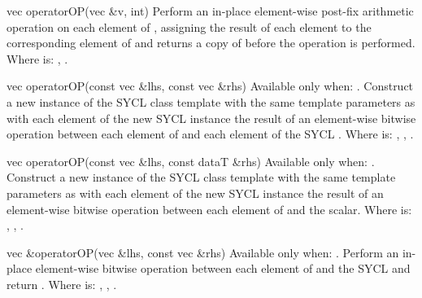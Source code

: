   \addRow
  {vec operatorOP(vec \&v, int)}
  {
    Perform an in-place element-wise  post-fix arithmetic operation on each element of  , assigning the result of each element to the corresponding element of   and returns a copy of   before the operation is performed.
    \newline \newline
    Where  is: \codeinline{++}, \codeinline{--}.
  }
  
  \addRow
  {vec operatorOP(const vec \&lhs, const vec \&rhs)}
  {
    Available only when: .
    \newline
    Construct a new instance of the SYCL  class template with the same template parameters as   with each element of the new SYCL  instance the result of an element-wise  bitwise operation between each element of   and each element of the  SYCL .
    \newline \newline
    Where  is: \codeinline{\&}, \codeinline{\|}, \codeinline{\^}.
  }

  \addRow
  {vec operatorOP(const vec \&lhs, const dataT \&rhs)}
  {
    Available only when: .
    \newline
    Construct a new instance of the SYCL  class template with the same template parameters as   with each element of the new SYCL  instance the result of an element-wise  bitwise operation between each element of   and the  scalar.
    \newline \newline
    Where  is: \codeinline{\&}, \codeinline{\|}, \codeinline{\^}.
  }

  \addRow
  {vec \&operatorOP(vec \&lhs, const vec \&rhs)}
  {
    Available only when: .
    \newline
    Perform an in-place element-wise  bitwise operation between each element of   and the  SYCL  and return  .
    \newline \newline
    Where  is: \codeinline{\&=}, \codeinline{\|=}, \codeinline{\^=}.
  }

